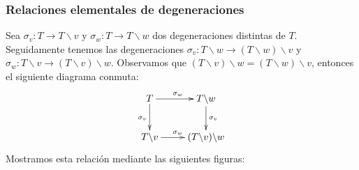 \documentclass[11pt,a4paper,openright,oneside]{article}
\numberwithin{equation}{section}
\theoremstyle{definition}
\begin{document}
\subsubsection*{Relaciones elementales de degeneraciones}
Sea $\sigma_v \colon T\to T\backslash v$ y $\sigma_w \colon T\to T\backslash w$ dos degeneraciones distintas de $T$.
Seguidamente tenemos las degeneraciones $\sigma_v \colon T\backslash w \to (T\backslash w)\backslash v$ y $\sigma_w \colon T\backslash v \to (T\backslash v)\backslash w$. Observamos que $(T\backslash v)\backslash w = (T\backslash w)\backslash v$, entonces el siguiente diagrama conmuta:
$$
    \xymatrix{
        T \ar[d]_{\sigma_v} \ar[r]^{\sigma_w}
        &T\backslash w \ar[d]^{\sigma_v} \\
        T\backslash v \ar[r]^{\sigma_w}
        &(T\backslash v)\backslash w
    }
$$
Mostramos esta relaci\'on mediante las siguientes figuras:
\end{document}
